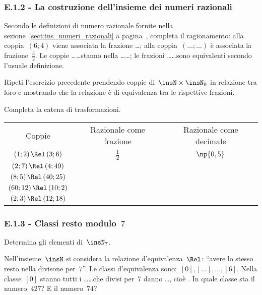 \subsubsection*{E.1.2 - La costruzione dell'insieme dei numeri razionali}
\begin{esercizio}
\label{ese:E.3}
Secondo le definizioni di numero razionale fornite nella sezione~\ref{sect:ins_numeri_razionali} a pagina~\pageref{sect:ins_numeri_razionali},
completa il ragionamento: alla coppia~$(6;4)$ viene associata la frazione \ldots; alla coppia~$(\ldots; \ldots)$ è associata
la frazione~$\frac{3}{2}$. Le coppie \ldots\ldots stanno nella \ldots\ldots;
le frazioni \ldots\ldots sono equivalenti secondo l'usuale definizione.
\end{esercizio}

\begin{esercizio}
\label{ese:E.4}
Ripeti l'esercizio precedente prendendo coppie di~$\insN \times \insN_0$ in relazione tra loro e mostrando che la relazione è di equivalenza tra le rispettive frazioni.
\end{esercizio}

\begin{esercizio}
\label{ese:E.5}
Completa la catena di trasformazioni.
\begin {center}
\begin{tabular}{ccc}
 \toprule
  Coppie & Razionale come frazione & Razionale come decimale\\
  $(1;2)\,\Rel\,(3;6)$&$\frac{1}{2}$&$\np{0,5}$\\
  $(2;7)\,\Rel\,(4;49)$& & \\
  $(8;5)\,\Rel\,(40;25)$& & \\
  $(60;12)\,\Rel\,(10;2)$& & \\
  $(2;3)\,\Rel\,(12;18)$& & \\
  \bottomrule
 \end{tabular}
\end{center}
\end{esercizio}

\subsubsection*{E.1.3 - Classi resto modulo~$7$}
\begin{esercizio}
\label{ese:E.6}
Determina gli elementi di~$\insN_7$.

Nell'insieme~$\insN$ si considera la relazione d'equivalenza~$\Rel$:
``avere lo stesso resto nella divisone per~$7$''. Le classi d'equivalenza sono:~$[0], [\ldots], \ldots, [6]$.
Nella classe~$[0]$ stanno tutti i \ldots\ldots che divisi per~7 danno \ldots, cioè \dotfill.
In quale classe sta il numero~$427$? E il numero~$74$?
\end{esercizio}

